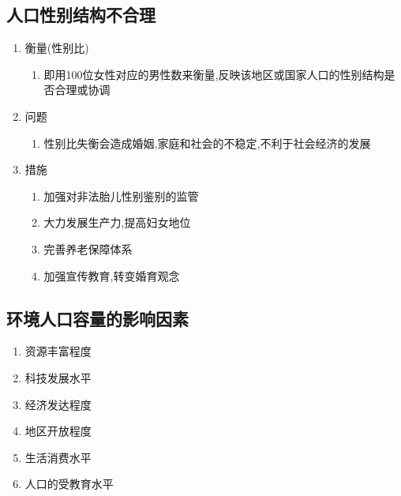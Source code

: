 \documentclass[a4paper]{article}
\begin{document}
    \subsection{人口性别结构不合理}
    \begin{enumerate}
        \item 衡量(性别比)
        \begin{enumerate}
            \item 即用100位女性对应的男性数来衡量,反映该地区或国家人口的性别结构是否合理或协调
        \end{enumerate}
        \item 问题
        \begin{enumerate}
            \item 性别比失衡会造成婚姻,家庭和社会的不稳定,不利于社会经济的发展
        \end{enumerate}
        \item 措施
        \begin{enumerate}
            \item 加强对非法胎儿性别鉴别的监管
            \item 大力发展生产力,提高妇女地位
            \item 完善养老保障体系
            \item 加强宣传教育,转变婚育观念
        \end{enumerate}
    \end{enumerate}
    \subsection{环境人口容量的影响因素}
    \begin{enumerate}
        \item 资源丰富程度
        \item 科技发展水平
        \item 经济发达程度
        \item 地区开放程度
        \item 生活消费水平
        \item 人口的受教育水平
    \end{enumerate}
\end{document}
